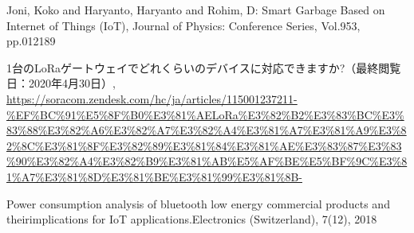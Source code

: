 \documentclass[Japanese]{dicomopapers}
\begin{document}
\begin{thebibliography}{4}
     Joni, Koko and Haryanto, Haryanto and Rohim, D: Smart Garbage Based on Internet of Things (IoT), Journal of Physics: Conference Series, Vol.953, pp.012189

     1台のLoRaゲートウェイでどれくらいのデバイスに対応できますか?（最終閲覧日：2020年4月30日）, \url{https://soracom.zendesk.com/hc/ja/articles/115001237211-%EF%BC%91%E5%8F%B0%E3%81%AELoRa%E3%82%B2%E3%83%BC%E3%83%88%E3%82%A6%E3%82%A7%E3%82%A4%E3%81%A7%E3%81%A9%E3%82%8C%E3%81%8F%E3%82%89%E3%81%84%E3%81%AE%E3%83%87%E3%83%90%E3%82%A4%E3%82%B9%E3%81%AB%E5%AF%BE%E5%BF%9C%E3%81%A7%E3%81%8D%E3%81%BE%E3%81%99%E3%81%8B-}

     Power consumption analysis of bluetooth low energy commercial products and theirimplications for IoT applications.Electronics (Switzerland), 7(12), 2018

\end{thebibliography}
\end{document}
